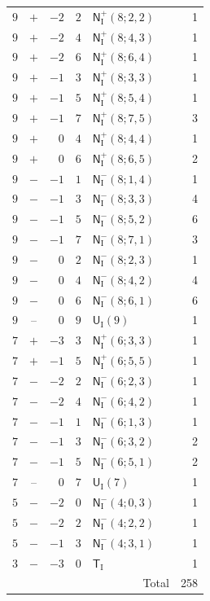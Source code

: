 \documentclass[10pt]{article}
\begin{document}
\begin{longtable}{@{}r c r r >{\RaggedRight\arraybackslash}p{0.48\linewidth} r@{}}
$9$ & $+$ & $-2$ & $2$ & $\mathsf N_{\mathrm I}^{+}(8;2,2)$ & 1 \\
$9$ & $+$ & $-2$ & $4$ & $\mathsf N_{\mathrm I}^{+}(8;4,3)$ & 1 \\
$9$ & $+$ & $-2$ & $6$ & $\mathsf N_{\mathrm I}^{+}(8;6,4)$ & 1 \\
$9$ & $+$ & $-1$ & $3$ & $\mathsf N_{\mathrm I}^{+}(8;3,3)$ & 1 \\
$9$ & $+$ & $-1$ & $5$ & $\mathsf N_{\mathrm I}^{+}(8;5,4)$ & 1 \\
$9$ & $+$ & $-1$ & $7$ & $\mathsf N_{\mathrm I}^{+}(8;7,5)$ & 3 \\
$9$ & $+$ & $0$ & $4$ & $\mathsf N_{\mathrm I}^{+}(8;4,4)$ & 1 \\
$9$ & $+$ & $0$ & $6$ & $\mathsf N_{\mathrm I}^{+}(8;6,5)$ & 2 \\
$9$ & $-$ & $-1$ & $1$ & $\mathsf N_{\mathrm I}^{-}(8;1,4)$ & 1 \\
$9$ & $-$ & $-1$ & $3$ & $\mathsf N_{\mathrm I}^{-}(8;3,3)$ & 4 \\
$9$ & $-$ & $-1$ & $5$ & $\mathsf N_{\mathrm I}^{-}(8;5,2)$ & 6 \\
$9$ & $-$ & $-1$ & $7$ & $\mathsf N_{\mathrm I}^{-}(8;7,1)$ & 3 \\
$9$ & $-$ & $0$ & $2$ & $\mathsf N_{\mathrm I}^{-}(8;2,3)$ & 1 \\
$9$ & $-$ & $0$ & $4$ & $\mathsf N_{\mathrm I}^{-}(8;4,2)$ & 4 \\
$9$ & $-$ & $0$ & $6$ & $\mathsf N_{\mathrm I}^{-}(8;6,1)$ & 6 \\
$9$ & $\text{--}$ & $0$ & $9$ & $\mathsf U_{\mathrm I}(9)$ & 1 \\
$7$ & $+$ & $-3$ & $3$ & $\mathsf N_{\mathrm I}^{+}(6;3,3)$ & 1 \\
$7$ & $+$ & $-1$ & $5$ & $\mathsf N_{\mathrm I}^{+}(6;5,5)$ & 1 \\
$7$ & $-$ & $-2$ & $2$ & $\mathsf N_{\mathrm I}^{-}(6;2,3)$ & 1 \\
$7$ & $-$ & $-2$ & $4$ & $\mathsf N_{\mathrm I}^{-}(6;4,2)$ & 1 \\
$7$ & $-$ & $-1$ & $1$ & $\mathsf N_{\mathrm I}^{-}(6;1,3)$ & 1 \\
$7$ & $-$ & $-1$ & $3$ & $\mathsf N_{\mathrm I}^{-}(6;3,2)$ & 2 \\
$7$ & $-$ & $-1$ & $5$ & $\mathsf N_{\mathrm I}^{-}(6;5,1)$ & 2 \\
$7$ & $\text{--}$ & $0$ & $7$ & $\mathsf U_{\mathrm I}(7)$ & 1 \\
$5$ & $-$ & $-2$ & $0$ & $\mathsf N_{\mathrm I}^{-}(4;0,3)$ & 1 \\
$5$ & $-$ & $-2$ & $2$ & $\mathsf N_{\mathrm I}^{-}(4;2,2)$ & 1 \\
$5$ & $-$ & $-1$ & $3$ & $\mathsf N_{\mathrm I}^{-}(4;3,1)$ & 1 \\
$3$ & $-$ & $-3$ & $0$ & $\mathsf T_{\mathrm I}$ & 1 \\
\midrule
\multicolumn{5}{r}{Total} & 258 \\
\end{longtable}
\end{document}
